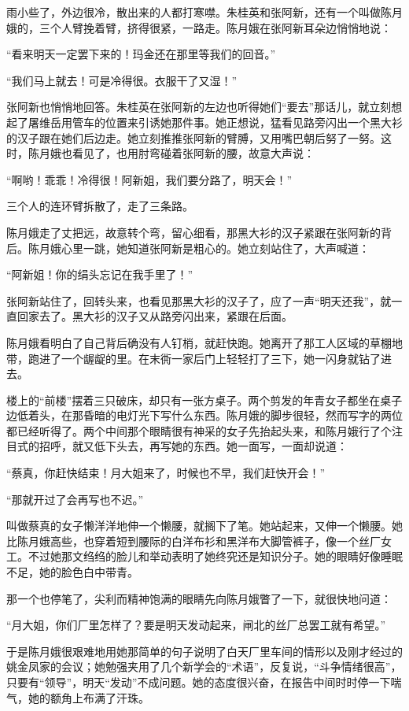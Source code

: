 \par 雨小些了，外边很冷，散出来的人都打寒噤。朱桂英和张阿新，还有一个叫做陈月娥的，三个人臂挽着臂，挤得很紧，一路走。陈月娥在张阿新耳朵边悄悄地说：
\par “看来明天一定罢下来的！玛金还在那里等我们的回音。”
\par “我们马上就去！可是冷得很。衣服干了又湿！”
\par 张阿新也悄悄地回答。朱桂英在张阿新的左边也听得她们“要去”那话儿，就立刻想起了屠维岳用管车的位置来引诱她那件事。她正想说，猛看见路旁闪出一个黑大衫的汉子跟在她们后边走。她立刻推推张阿新的臂膊，又用嘴巴朝后努了一努。这时，陈月娥也看见了，也用肘弯碰着张阿新的腰，故意大声说：
\par “啊哟！乖乖！冷得很！阿新姐，我们要分路了，明天会！”
\par 三个人的连环臂拆散了，走了三条路。
\par 陈月娥走了丈把远，故意转个弯，留心细看，那黑大衫的汉子紧跟在张阿新的背后。陈月娥心里一跳，她知道张阿新是粗心的。她立刻站住了，大声喊道：
\par “阿新姐！你的绢头忘记在我手里了！”
\par 张阿新站住了，回转头来，也看见那黑大衫的汉子了，应了一声“明天还我”，就一直回家去了。黑大衫的汉子又从路旁闪出来，紧跟在后面。
\par 陈月娥看明白了自己背后确没有人钉梢，就赶快跑。她离开了那工人区域的草棚地带，跑进了一个龌龊的里。在末衖一家后门上轻轻打了三下，她一闪身就钻了进去。
\par 楼上的“前楼”摆着三只破床，却只有一张方桌子。两个剪发的年青女子都坐在桌子边低着头，在那昏暗的电灯光下写什么东西。陈月娥的脚步很轻，然而写字的两位都已经听得了。两个中间那个眼睛很有神采的女子先抬起头来，和陈月娥行了个注目式的招呼，就又低下头去，再写她的东西。她一面写，一面却说道：
\par “蔡真，你赶快结束！月大姐来了，时候也不早，我们赶快开会！”
\par “那就开过了会再写也不迟。”
\par 叫做蔡真的女子懒洋洋地伸一个懒腰，就搁下了笔。她站起来，又伸一个懒腰。她比陈月娥高些，也穿着短到腰际的白洋布衫和黑洋布大脚管裤子，像一个丝厂女工。不过她那文绉绉的脸儿和举动表明了她终究还是知识分子。她的眼睛好像睡眠不足，她的脸色白中带青。
\par 那一个也停笔了，尖利而精神饱满的眼睛先向陈月娥瞥了一下，就很快地问道：
\par “月大姐，你们厂里怎样了？要是明天发动起来，闸北的丝厂总罢工就有希望。”
\par 于是陈月娥很艰难地用她那简单的句子说明了白天厂里车间的情形以及刚才经过的姚金凤家的会议；她勉强夹用了几个新学会的“术语”，反复说，“斗争情绪很高”，只要有“领导”，明天“发动”不成问题。她的态度很兴奋，在报告中间时时停一下喘气，她的额角上布满了汗珠。
